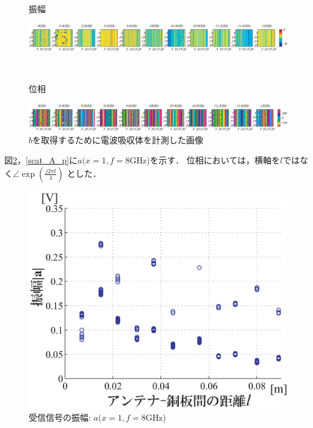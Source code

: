 ﻿\documentclass[12pt,oneside]{jsbook}
\begin{document}
\begin{figure}[ht]
 \begin{center}
     \begin{minipage}[c]{0.05\hsize}
振幅
  \end{minipage}
     \begin{minipage}[c]{0.94\hsize}
\includegraphics[width = \hsize ]{direct1_amp_raw.eps}
  \end{minipage}
\\
     \begin{minipage}[c]{0.05\hsize}
位相
  \end{minipage}
     \begin{minipage}[c]{0.94\hsize}
\includegraphics[width =\hsize ]{direct1_phs_raw.eps}
  \end{minipage}
\caption{$b$を取得するために電波吸収体を計測した画像}
\label{b-hosei}
 \end{center}
\end{figure}

図\ref{scat_A_a}，\ref{scat_A_p}に$a(x=1,f=8$GHz)を示す．
位相においては，横軸を$l$ではなく$\angle \exp{\left( \frac{j2\pi l}{\lambda} \right) }$
とした．
\begin{figure}[t]
 \begin{center}
\includegraphics[width =\hsize ]{scatter_A_mag.eps}
\caption{受信信号の振幅: $a(x=1,f=8$GHz)}
\label{scat_A_a}
\end{center}
\end{figure}
\end{document}
